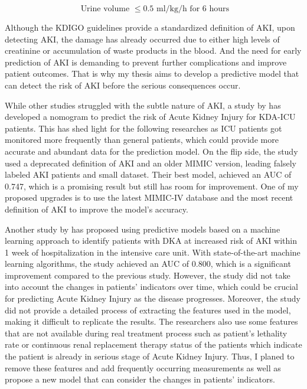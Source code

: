 \documentclass[../main.tex]{subfiles}
\begin{document}
\begin{equation}
    \text{ Urine volume } \le 0.5 \text{ ml/kg/h for 6 hours}
\end{equation}

Although the KDIGO guidelines provide a standardized definition of AKI, upon detecting AKI, the damage has already occurred due to either high levels of creatinine or accumulation of waste products in the blood.
And the need for early prediction of \gls{AKI} is demanding to prevent further complications and improve patient outcomes.
That is why my thesis aims to develop a predictive model that can detect the risk of \gls{AKI} before the serious consequences occur.

While other studies struggled with the subtle nature of AKI, a study by \citeauthor{monogram-aki-dka} has developed a nomogram to predict the risk of Acute Kidney Injury for KDA-ICU patients.
This has shed light for the following researches as \gls{ICU} patients got monitored more frequently than general patients, which could provide more accurate and abundant data for the prediction model.
On the flip side, the study used a deprecated definition of \gls{AKI} and an older \gls{MIMIC} version, leading falsely labeled \gls{AKI} patients and small dataset.
Their best model, achieved an \gls{AUC} of 0.747, which is a promising result but still has room for improvement.
One of my proposed upgrades is to use the latest \gls{MIMIC-IV} database and the most recent definition of \gls{AKI} to improve the model's accuracy.

Another study by \citeauthor{xgboost-aki-dka} has proposed using predictive models based on a machine learning approach to identify patients with \gls{DKA} at increased risk of \gls{AKI} within 1 week of hospitalization in the intensive care unit.
With state-of-the-art machine learning algorithms, the study achieved an \gls{AUC} of 0.800, which is a significant improvement compared to the previous study.
However, the study did not take into account the changes in patients' indicators over time, which could be crucial for predicting Acute Kidney Injury as the disease progresses.
Moreover, the study did not provide a detailed process of extracting the features used in the model, making it difficult to replicate the results.
The researchers also use some features that are not available during real treatment process such as patient's lethality rate or continuous renal replacement therapy status of the patients which indicate the patient is already in serious stage of Acute Kidney Injury.
Thus, I planed to remove these features and add frequently occurring measurements as well as propose a new model that can consider the changes in patients' indicators.
\end{document}
